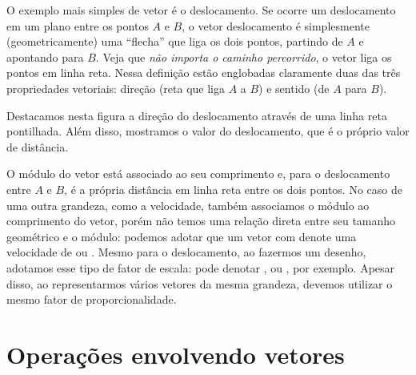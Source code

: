 O exemplo mais simples de vetor é o deslocamento. Se ocorre um deslocamento em um plano entre os pontos $A$ e $B$, o vetor deslocamento é simplesmente (geometricamente) uma ``flecha'' que liga os dois pontos, partindo de $A$ e apontando para $B$. Veja que \emph{não importa o caminho percorrido}, o vetor liga os pontos em linha reta. Nessa definição estão englobadas claramente duas das três propriedades vetoriais: direção (reta que liga $A$ a $B$) e sentido (de $A$ para $B$). 

\begin{marginfigure}
\centering
{}
\caption{Destacamos nesta figura a direção do deslocamento através de uma linha reta pontilhada. Além disso, mostramos o valor do deslocamento, que é o próprio valor de distância.}
\end{marginfigure}

O módulo do vetor está associado ao seu comprimento e, para o deslocamento entre $A$ e $B$, é a própria distância em linha reta entre os dois pontos. No caso de uma outra grandeza, como a velocidade, também associamos o módulo ao comprimento do vetor, porém não temos uma relação direta entre seu tamanho geométrico e o módulo: podemos adotar que um vetor com  denote uma velocidade de  ou . Mesmo para o deslocamento, ao fazermos um desenho, adotamos esse tipo de fator de escala:  pode denotar , ou , por exemplo. Apesar disso, ao representarmos vários vetores da mesma grandeza, devemos utilizar o mesmo fator de proporcionalidade.

\section{Operações envolvendo vetores}


